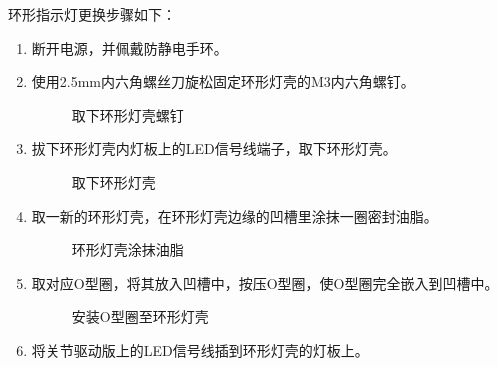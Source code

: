 \documentclass[a4paper,11pt,english,openany,oneside]{sphinxmanual}
\begin{document}
\sphinxAtStartPar
环形指示灯更换步骤如下：
\begin{enumerate}
%
\item {} 
\sphinxAtStartPar
断开电源，并佩戴防静电手环。

\item {} 
\sphinxAtStartPar
使用2.5mm内六角螺丝刀旋松固定环形灯壳的M3内六角螺钉。

\begin{figure}[H]
\centering
\capstart

\noindent{}
\caption{取下环形灯壳螺钉}\label{\detokenize{_u66f4_u6362_u95f7_u76d6_uff0c_u73af_u5f62_u706f_u58f3:id13}}\end{figure}

\item {} 
\sphinxAtStartPar
拔下环形灯壳内灯板上的LED信号线端子，取下环形灯壳。

\begin{figure}[H]
\centering
\capstart

\noindent{}
\caption{取下环形灯壳}\label{\detokenize{_u66f4_u6362_u95f7_u76d6_uff0c_u73af_u5f62_u706f_u58f3:id14}}\end{figure}

\item {} 
\sphinxAtStartPar
取一新的环形灯壳，在环形灯壳边缘的凹槽里涂抹一圈密封油脂。

\begin{figure}[H]
\centering
\capstart

\noindent{}
\caption{环形灯壳涂抹油脂}\label{\detokenize{_u66f4_u6362_u95f7_u76d6_uff0c_u73af_u5f62_u706f_u58f3:id15}}\end{figure}

\item {} 
\sphinxAtStartPar
取对应O型圈，将其放入凹槽中，按压O型圈，使O型圈完全嵌入到凹槽中。

\begin{figure}[H]
\centering
\capstart

\noindent{}
\caption{安装O型圈至环形灯壳}\label{\detokenize{_u66f4_u6362_u95f7_u76d6_uff0c_u73af_u5f62_u706f_u58f3:id16}}\end{figure}

\item {} 
\sphinxAtStartPar
将关节驱动版上的LED信号线插到环形灯壳的灯板上。


\end{enumerate}
\end{document}
